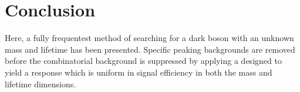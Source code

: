 \section{Conclusion}

Here, a fully frequentest method of searching for a dark boson with an unknown mass and lifetime
has been presented.
Specific peaking backgrounds are removed before the combinatorial background is suppressed by
applying a \uBDT designed to yield a response which is uniform in signal efficiency in both the
mass and lifetime dimensions.




